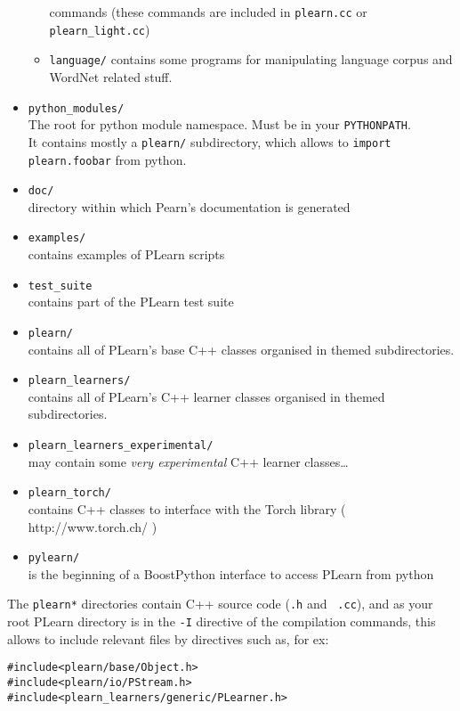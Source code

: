\documentclass[11pt]{book}
\begin{document}
\begin{itemize}
\begin{itemize}
    commands (these commands are included in \verb!plearn.cc! or \verb!plearn_light.cc!)
  \item \verb!language/! contains some programs for manipulating language
    corpus and WordNet related stuff.
  \end{itemize}
\item \verb!python_modules/! \\
The root for python module namespace. Must be in your \verb!PYTHONPATH!. \\
It contains mostly a \verb!plearn/! subdirectory, which allows to \verb!import plearn.foobar! from python.
\item \verb!doc/! \\
directory within which Pearn's documentation is generated
\item \verb!examples/! \\
contains examples of PLearn scripts 
\item \verb!test_suite! \\
contains part of the PLearn test suite
\item \verb!plearn/! \\
contains all of PLearn's base C++ classes organised in themed subdirectories.
\item \verb!plearn_learners/! \\
contains all of PLearn's C++ learner classes organised in themed subdirectories.
\item \verb!plearn_learners_experimental/! \\
may contain some {\em very experimental} C++ learner classes\ldots
\item \verb!plearn_torch/! \\
contains C++ classes to interface with the Torch library ( http://www.torch.ch/ )
\item \verb!pylearn/! \\
is the beginning of a BoostPython interface to access PLearn from python
\end{itemize}

The \verb!plearn*! directories contain C++ source code ({\tt .h} and {\tt
  .cc}), and as your root PLearn directory is in the \verb!-I! directive of
the compilation commands, this allows to include relevant files by
directives such as, for ex:
\begin{verbatim}
#include<plearn/base/Object.h>
#include<plearn/io/PStream.h>
#include<plearn_learners/generic/PLearner.h>
\end{verbatim}
\end{document}
